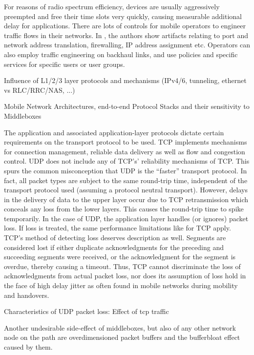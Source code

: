 For reasons of radio spectrum efficiency, devices are usually aggressively preempted and free their time slots very quickly, causing measurable additional delay for applications.
There are lots of controls for mobile operators to engineer traffic flows in their networks. In \cite{sigcomm11middleboxes}, the authors show artifacts relating to port and network address translation, firewalling, \gls{IP} address assignment etc. Operators can also employ traffic engineering on backhaul links, and use policies and specific services for specific users or user groups.

 Influence of L1/2/3 layer protocols and mechanisms (IPv4/6, tunneling, ethernet vs RLC/RRC/NAS, ...)

Mobile Network Architectures, end-to-end Protocol Stacks and their sensitivity to Middleboxes

The application and associated application-layer protocols dictate certain requirements on the transport protocol to be used. \gls{TCP} implements mechanisms for connection management, reliable data delivery as well as flow and congestion control.
\gls{UDP} does not include any of \gls{TCP}'s' reliability mechanisms of \gls{TCP}. This spurs the common misconception that \gls{UDP} is the ``faster'' transport protocol. In fact, all packet types are subject to the same round-trip time, independent of the transport protocol used (assuming a protocol neutral transport).
However, delays in the delivery of data to the upper layer occur due to \gls{TCP} retransmission which conceals any loss from the lower layers. This causes the round-trip time to spike temporarily. In the case of \gls{UDP}, the application layer handles (or ignores) packet loss. If loss is treated, the same performance limitations like for \gls{TCP} apply.
\gls{TCP}'s method of detecting loss deserves description as well. Segments are considered lost if either duplicate acknowledgments for the preceding and succeeding segments were received, or the acknowledgment for the segment is overdue, thereby causing a timeout. Thus, \gls{TCP} cannot discriminate the loss of acknowledgments from actual packet loss, nor does its assumption of loss hold in the face of high delay jitter as often found in mobile networks during mobility and handovers.

Characteristics of UDP packet loss: Effect of tcp traffic \cite{sawashima97characteristics}


Another undesirable side-effect of middleboxes, but also of any other network node on the path are overdimensioned packet buffers and the bufferbloat effect caused by them.

